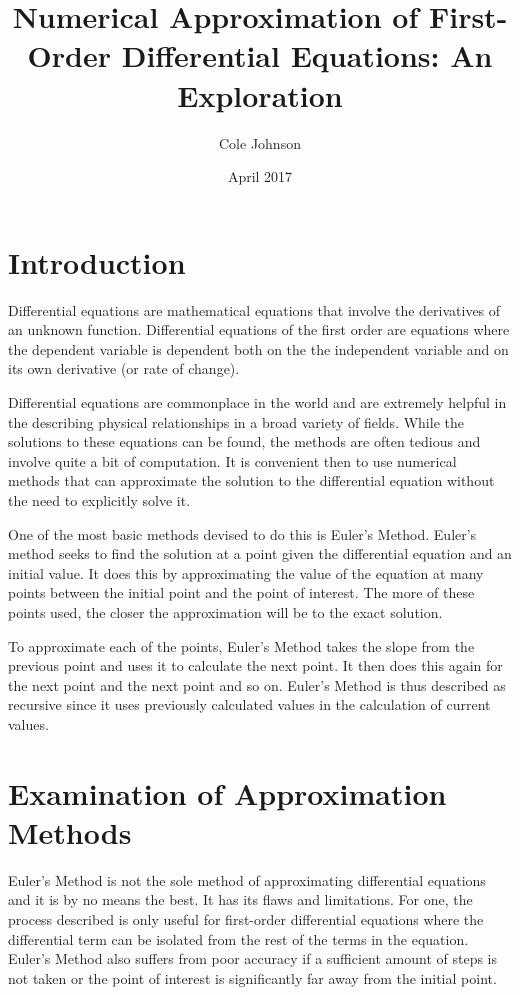 \documentclass[12pt, letterpaper]{report}
\title{Numerical Approximation of First-Order Differential Equations: An Exploration}
\author{Cole Johnson}
\date{April 2017}
\begin{document}
\maketitle

\section*{Introduction}
Differential equations are mathematical equations that involve the derivatives of an unknown function. Differential equations of the first order are equations where the dependent variable is dependent both on the the independent variable and on its own derivative (or rate of change).

Differential equations are commonplace in the world and are extremely helpful in the describing physical relationships in a broad variety of fields. While the solutions to these equations can be found, the methods are often tedious and involve quite a bit of computation. It is convenient then to use numerical methods that can approximate the solution to the differential equation without the need to explicitly solve it.

One of the most basic methods devised to do this is Euler's Method. Euler's method seeks to find the solution at a point given the differential equation and an initial value. It does this by approximating the value of the equation at many points between the initial point and the point of interest. The more of these points used, the closer the approximation will be to the exact solution.

To approximate each of the points, Euler's Method takes the slope from the previous point and uses it to calculate the next point. It then does this again for the next point and the next point and so on. Euler's Method is thus described as recursive since it uses previously calculated values in the calculation of current values.

\section*{Examination of Approximation Methods}

Euler's Method is not the sole method of approximating differential equations and it is by no means the best. It has its flaws and limitations. For one, the process described is only useful for first-order differential equations where the differential term can be isolated from the rest of the terms in the equation. Euler's Method also suffers from poor accuracy if a sufficient amount of steps is not taken or the point of interest is significantly far away from the initial point.
\end{document}

